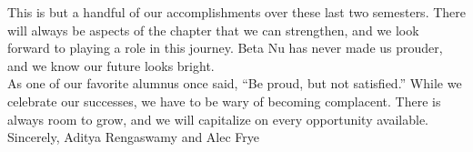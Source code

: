 This is but a handful of our accomplishments over these last two semesters. There will always be aspects of the chapter that we can strengthen, and we look forward to playing a role in this journey. Beta Nu has never made us prouder, and we know our future looks bright. \\

As one of our favorite alumnus once said, “Be proud, but not satisfied.” While we celebrate our successes, we have to be wary of becoming complacent. There is always room to grow, and we will capitalize on every opportunity available. \\

Sincerely,
Aditya Rengaswamy and Alec Frye
